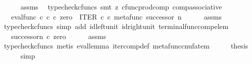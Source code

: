\begin{isabellebody}
\ \ \ \ \isamarkupfalse%
\ assms\ \isamarkupfalse%
\ {\isacharparenleft}{\kern0pt}typecheck{\isacharunderscore}{\kern0pt}cfuncs{\isacharcomma}{\kern0pt}\ smt\ {\isacharparenleft}{\kern0pt}z{}{\isacharparenright}{\kern0pt}\ cfunc{\isacharunderscore}{\kern0pt}prod{\isacharunderscore}{\kern0pt}comp\ comp{\isacharunderscore}{\kern0pt}associative{}{\isacharparenright}{\kern0pt}\isanewline
\ \ \isamarkupfalse%
\ \isamarkupfalse%
\ {\isachardoublequoteopen}{\isachardot}{\kern0pt}{\isachardot}{\kern0pt}{\isachardot}{\kern0pt}\ {\isacharequal}{\kern0pt}\ eval{\isacharunderscore}{\kern0pt}func\ {\isasymnat}\isactrlsub c\ {\isasymnat}\isactrlsub c\ {\isasymcirc}\isactrlsub c\ {\isasymlangle}zero{\isacharcomma}{\kern0pt}\ \ ITER\ {\isasymnat}\isactrlsub c\ {\isasymcirc}\isactrlsub c\ {\isasymlangle}metafunc\ successor{\isacharcomma}{\kern0pt}\ n{\isasymrangle}{\isasymrangle}{\isachardoublequoteclose}\isanewline
\ \ \ \ \isamarkupfalse%
\ assms\ \isamarkupfalse%
\ {\isacharparenleft}{\kern0pt}typecheck{\isacharunderscore}{\kern0pt}cfuncs{\isacharcomma}{\kern0pt}\ simp\ add{\isacharcolon}{\kern0pt}\ id{\isacharunderscore}{\kern0pt}left{\isacharunderscore}{\kern0pt}unit{}\ id{\isacharunderscore}{\kern0pt}right{\isacharunderscore}{\kern0pt}unit{}\ terminal{\isacharunderscore}{\kern0pt}func{\isacharunderscore}{\kern0pt}comp{\isacharunderscore}{\kern0pt}elem{\isacharparenright}{\kern0pt}\isanewline
\ \ \isamarkupfalse%
\ \isamarkupfalse%
\ {\isachardoublequoteopen}{\isachardot}{\kern0pt}{\isachardot}{\kern0pt}{\isachardot}{\kern0pt}\ {\isacharequal}{\kern0pt}\ {\isacharparenleft}{\kern0pt}successor\isactrlbsup {\isasymcirc}n\isactrlesup {\isacharparenright}{\kern0pt}\ {\isasymcirc}\isactrlsub c\ zero{\isachardoublequoteclose}\isanewline
\ \ \ \ \isamarkupfalse%
\ assms\ \isamarkupfalse%
\ {\isacharparenleft}{\kern0pt}typecheck{\isacharunderscore}{\kern0pt}cfuncs{\isacharcomma}{\kern0pt}\ metis\ eval{\isacharunderscore}{\kern0pt}lemma\ iter{\isacharunderscore}{\kern0pt}comp{\isacharunderscore}{\kern0pt}def{}\ metafunc{\isacharunderscore}{\kern0pt}cnufatem{\isacharparenright}{\kern0pt}\isanewline
\ \ \isamarkupfalse%
\ \isamarkupfalse%
\ {\isacharquery}{\kern0pt}thesis\isanewline
\ \ \ \ \isamarkupfalse%
\ simp\isanewline
{}\isamarkupfalse%
%
\endisatagproof
{\isafoldproof}%
%
\isadelimproof

\end{isabellebody}
